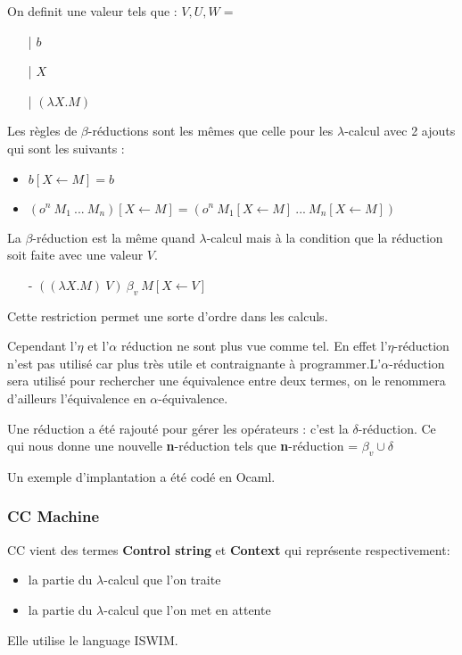 \documentclass[10pt,a4paper]{article}
\begin{document}
			On definit une valeur tels que :
			\smallbreak
			$V,U,W =$
			\begin{itemize}
				\item[|] $b$
				\item[|] $X$
				\item[|] $(\lambda X.M)$
			\end{itemize}
			\bigbreak
			
			
			Les règles de $\beta$-réductions sont les mêmes que celle pour les $\lambda$-calcul avec 2 ajouts qui sont les suivants :
			\begin{itemize}
				\item $b[X \longleftarrow M] = b$
				\item $(o^{n}~M_{1}~...~M_{n})[X \longleftarrow M] = (o^{n}~M_{1}[X \longleftarrow M]~...~M_{n}[X \longleftarrow M])$
			\end{itemize}
			\bigbreak
			
			
			La $\beta$-réduction est la même quand $\lambda$-calcul mais à la condition que la réduction soit faite avec une valeur $V$. 
			\begin{itemize}
				\item[-] $((\lambda X.M)~V)~\beta_{v}~M[X \longleftarrow V]$
			\end{itemize} 
			\smallbreak
			Cette restriction permet une sorte d'ordre dans les calculs.
			\medbreak
			
			Cependant l'$\eta$ et l'$\alpha$ réduction ne sont plus vue comme tel. En effet l'$\eta$-réduction n'est pas utilisé car plus très utile et contraignante à programmer.L'$\alpha$-réduction sera utilisé pour rechercher une équivalence entre deux termes, on le renommera d'ailleurs l'équivalence en $\alpha$-équivalence.
			\medbreak
			
			Une réduction a été rajouté pour gérer les opérateurs : c'est la $\delta$-réduction. Ce qui nous donne une nouvelle \textbf{n}-réduction tels que \textbf{n}-réduction = $\beta_{v} \cup \delta$
			\bigbreak
			
			Un exemple d'implantation a été codé en Ocaml.
			
			\subsubsection{CC Machine}
			
			CC vient des termes \textbf{Control string} et \textbf{Context} qui représente respectivement:
			\begin{itemize}
				\item la partie du $\lambda$-calcul que l'on traite
				\item la partie du $\lambda$-calcul que l'on met en attente 
			\end{itemize}
			Elle utilise le language ISWIM.
			\bigbreak
			
\end{document}
